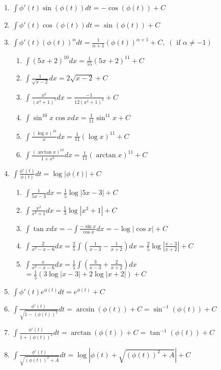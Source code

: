\begin{eg}
\begin{enumerate}
\item ${\displaystyle \int \phi'(t)\sin(\phi(t)) dt = -\cos(\phi(t)) + C}$
\item ${\displaystyle \int \phi'(t)\cos(\phi(t)) dt = \sin(\phi(t)) + C}$
\item ${\displaystyle \int \phi'(t)(\phi(t))^\alpha dt = \frac{1}{\alpha+1}(\phi(t))^{\alpha+1} + C, \;(\mbox{ if }\alpha\neq -1)}$
	\begin{enumerate}
	\item ${\displaystyle \int (5x+2)^{10} dx = \frac{1}{55}(5x+2)^{11} + C}$
	\item ${\displaystyle \int \frac{1}{\sqrt{x-2}} dx = 2\sqrt{x-2}+ C}$
	\item ${\displaystyle \int \frac{x^2}{(x^3+1)^5} dx = \frac{-1}{12(x^3+1)^4} + C}$
	\item ${\displaystyle \int \sin^{10}x\cos x dx = \frac{1}{11}\sin^{11} x+ C}$
	\item ${\displaystyle \int \frac{(\log x)^{10}}x dx = \frac{1}{11}(\log x)^{11}+ C}$
	\item ${\displaystyle \int \frac{(\arctan x)^{10}}{1+x^2}dx = \frac{1}{11}(\arctan x)^{11}+ C}$
	\end{enumerate}
\item ${\displaystyle \int \frac{\phi'(t)}{\phi(t)} dt = \log|\phi(t)| + C}$
	\begin{enumerate}
	\item ${\displaystyle \int \frac{1}{5x-3} dx = \frac{1}{5}\log|5x-3|+ C}$
	\item ${\displaystyle \int \frac{x^2}{x^3+1} dx = \frac{1}{3}\log|x^3+1|+ C}$
	\item ${\displaystyle \int \tan x dx = -\int \frac{-\sin x}{\cos x}dx = -\log|\cos x| + C}$
	\item ${\displaystyle \int \frac{2}{x^2- x - 6}dx  = \frac25\int\left(\frac{1}{x-3} - \frac{1}{x+2}\right)dx = \frac25\log\left|\frac{x-3}{x+2}\right| + C}$
	\item ${\displaystyle \int \frac{x}{x^2- x - 6}dx  = \frac15\int\left(\frac{3}{x-3} + \frac{2}{x+2}\right)dx}$\\
	$ = \frac15(3\log|x-3| + 2\log|x+2|)+ C$
	\end{enumerate}
\item ${\displaystyle \int \phi'(t)e^{\phi(t)} dt = e^{\phi(t)} + C}$
\item ${\displaystyle \int \frac{\phi'(t)}{\sqrt{1-(\phi(t))^2}} dt= \arcsin(\phi(t)) + C = \sin^{-1}(\phi(t)) + C}$
\item ${\displaystyle \int \frac{\phi'(t)}{1+(\phi(t))^2} dt = \arctan (\phi(t))+ C = \tan^{-1}(\phi(t)) + C}$
\item ${\displaystyle \int \frac{\phi'(t)}{\sqrt{(\phi(t))^2+A}} dt = \log|\phi(t)+\sqrt{(\phi(t))^2+A}| + C}$
\end{enumerate}
\end{eg}


